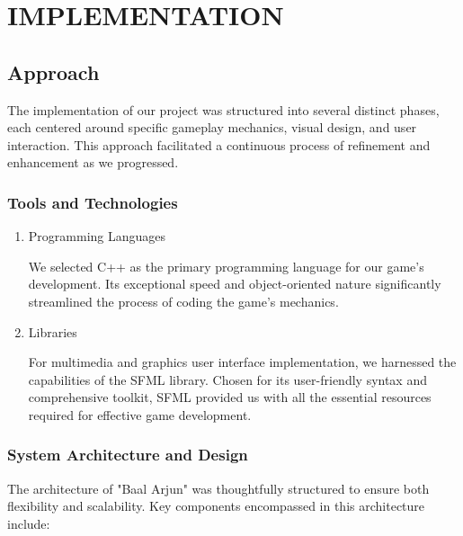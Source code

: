 \section{IMPLEMENTATION}


	 \subsection{Approach}
	
		The implementation of our project was structured into several distinct phases, each centered around specific gameplay mechanics, visual design, and user interaction. This approach facilitated a continuous process of refinement and enhancement as we progressed.
	
	 \subsubsection{Tools and Technologies}
		\begin{enumerate}
			\item Programming Languages
			
					We selected C++ as the primary programming language for our game's development. Its exceptional speed and object-oriented nature significantly streamlined the process of coding the game's mechanics.
			\item Libraries
			
					For multimedia and graphics user interface implementation, we harnessed the capabilities of the SFML library. Chosen for its user-friendly syntax and comprehensive toolkit, SFML provided us with all the essential resources required for effective game development.
			
		\end{enumerate}
	
	\subsubsection{System Architecture and Design}
	
		The architecture of "Baal Arjun" was thoughtfully structured to ensure both flexibility and scalability. Key components encompassed in this architecture include:
		
